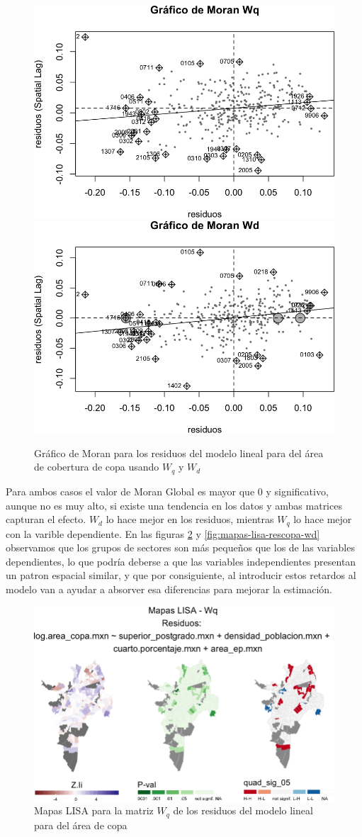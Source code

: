 \documentclass[12pt,]{book}
\begin{document}
\begin{figure}
\includegraphics[width=0.49\linewidth]{tesis-unigis_files/figure-latex/moranplot-rescopa-w-1} \includegraphics[width=0.49\linewidth]{tesis-unigis_files/figure-latex/moranplot-rescopa-w-2} \caption{Gráfico de Moran para los residuos del modelo lineal para del área de cobertura de copa usando $W_{q}$ y $W_{d}$ }\label{fig:moranplot-rescopa-w}
\end{figure}

Para ambos casos el valor de Moran Global es mayor que 0 y
significativo, aunque no es muy alto, si existe una tendencia en los
datos y ambas matrices capturan el efecto. \(W_d\) lo hace mejor en los
residuos, mientras \(W_q\) lo hace mejor con la varible dependiente. En
las figuras \ref{fig:mapas-lisa-rescopa-wq} y
\ref{fig:mapas-lisa-rescopa-wd} observamos que los grupos de sectores
son más pequeños que los de las variables dependientes, lo que podría
deberse a que las variables independientes presentan un patron espacial
similar, y que por consiguiente, al introducir estos retardos al modelo
van a ayudar a absorver esa diferencias para mejorar la estimación.

\begin{figure}
\includegraphics[width=1\linewidth]{tesis-unigis_files/figure-latex/mapas-lisa-rescopa-wq-1} \caption{Mapas LISA para la matriz $W_q$ de los residuos del modelo lineal para del área de copa}\label{fig:mapas-lisa-rescopa-wq}
\end{figure}
\end{document}
